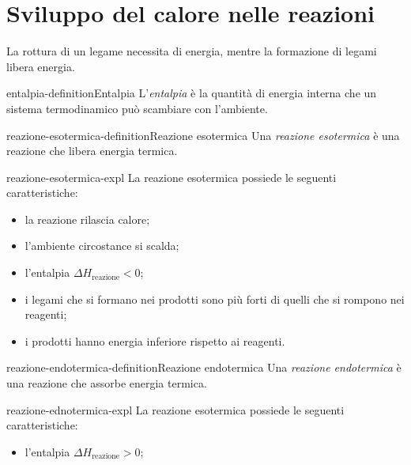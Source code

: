 \documentclass[preview]{standalone}
\begin{document}
\genpage

\section{Sviluppo del calore nelle reazioni}

\begin{plainhtml}
    La rottura di un legame necessita di energia, mentre
    la formazione di legami libera energia.
\end{plainhtml}


\begin{snippetdefinition}{entalpia-definition}{Entalpia}
    L'\textit{entalpia} è la quantità di energia interna che un sistema
    termodinamico può scambiare con l'ambiente.
\end{snippetdefinition}

\begin{snippetdefinition}{reazione-esotermica-definition}{Reazione esotermica}
    Una \textit{reazione esotermica} è una reazione che libera energia termica.
\end{snippetdefinition}

\begin{snippet}{reazione-esotermica-expl}
    La reazione esotermica possiede le seguenti caratteristiche:
    \begin{itemize}
        \item la reazione rilascia calore;
        \item l'ambiente circostance si scalda;
        \item l'entalpia \(\Delta H_{\text{reazione}} < 0\);
        \item i legami che si formano nei prodotti sono più forti di quelli che si rompono nei reagenti;
        \item i prodotti hanno energia inferiore rispetto ai reagenti.
    \end{itemize}
\end{snippet}

\begin{snippetdefinition}{reazione-endotermica-definition}{Reazione endotermica}
    Una \textit{reazione endotermica} è una reazione che assorbe energia termica.
\end{snippetdefinition}

\begin{snippet}{reazione-ednotermica-expl}
    La reazione esotermica possiede le seguenti caratteristiche:
    \begin{itemize}
        \item l'entalpia \(\Delta H_{\text{reazione}} > 0\);
    \end{itemize}
\end{snippet}
\end{document}
